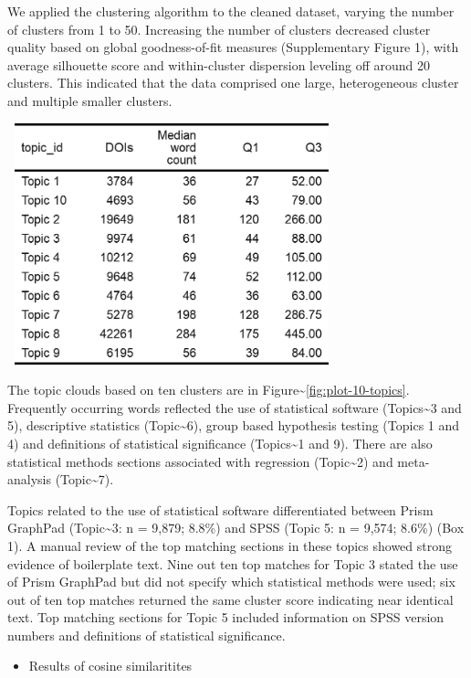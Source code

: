 \documentclass[12pt]{article}
\providecommand{\tightlist}{%
  \setlength{\itemsep}{0pt}\setlength{\parskip}{0pt}}
\begin{document}
We applied the clustering algorithm to the cleaned dataset, varying the
number of clusters from 1 to 50. Increasing the number of clusters
decreased cluster quality based on global goodness-of-fit measures
(Supplementary Figure 1), with average silhouette score and
within-cluster dispersion leveling off around 20 clusters. This
indicated that the data comprised one large, heterogeneous cluster and
multiple smaller clusters.

\includegraphics[width=3.75in,height=2.75in,keepaspectratio]{asa_template_files/figure-latex/unnamed-chunk-6-1.png}

The topic clouds based on ten clusters are in
Figure\textasciitilde{}\ref{fig:plot-10-topics}. Frequently occurring
words reflected the use of statistical software (Topics\textasciitilde3
and 5), descriptive statistics (Topic\textasciitilde6), group based
hypothesis testing (Topics 1 and 4) and definitions of statistical
significance (Topics\textasciitilde1 and 9). There are also statistical
methods sections associated with regression (Topic\textasciitilde2) and
meta-analysis (Topic\textasciitilde7).

Topics related to the use of statistical software differentiated between
Prism GraphPad (Topic\textasciitilde3: n = 9,879; 8.8\%) and SPSS (Topic
5: n = 9,574; 8.6\%) (Box 1). A manual review of the top matching
sections in these topics showed strong evidence of boilerplate text.
Nine out ten top matches for Topic 3 stated the use of Prism GraphPad
but did not specify which statistical methods were used; six out of ten
top matches returned the same cluster score indicating near identical
text. Top matching sections for Topic 5 included information on SPSS
version numbers and definitions of statistical significance.

\begin{itemize}
\tightlist
\item
  Results of cosine similaritites
\end{itemize}
\end{document}
